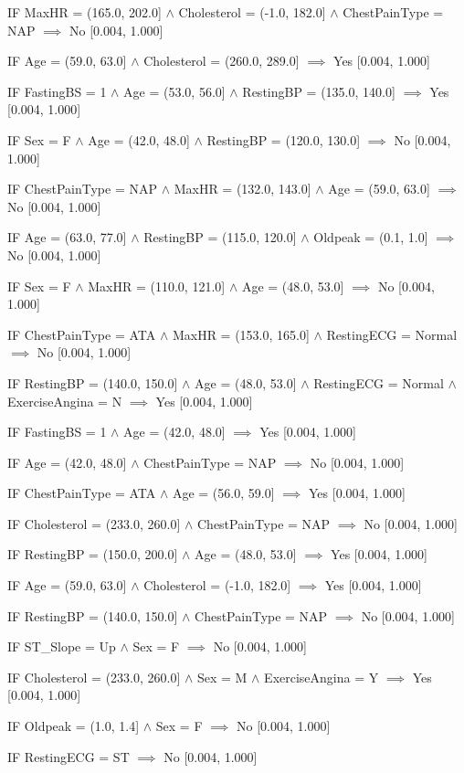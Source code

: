 IF MaxHR = (165.0, 202.0] $\land$ Cholesterol = (-1.0, 182.0] $\land$ ChestPainType = NAP $\implies$ No [0.004, 1.000]

IF Age = (59.0, 63.0] $\land$ Cholesterol = (260.0, 289.0] $\implies$ Yes [0.004, 1.000]

IF FastingBS = 1 $\land$ Age = (53.0, 56.0] $\land$ RestingBP = (135.0, 140.0] $\implies$ Yes [0.004, 1.000]

IF Sex = F $\land$ Age = (42.0, 48.0] $\land$ RestingBP = (120.0, 130.0] $\implies$ No [0.004, 1.000]

IF ChestPainType = NAP $\land$ MaxHR = (132.0, 143.0] $\land$ Age = (59.0, 63.0] $\implies$ No [0.004, 1.000]

IF Age = (63.0, 77.0] $\land$ RestingBP = (115.0, 120.0] $\land$ Oldpeak = (0.1, 1.0] $\implies$ No [0.004, 1.000]

IF Sex = F $\land$ MaxHR = (110.0, 121.0] $\land$ Age = (48.0, 53.0] $\implies$ No [0.004, 1.000]

IF ChestPainType = ATA $\land$ MaxHR = (153.0, 165.0] $\land$ RestingECG = Normal $\implies$ No [0.004, 1.000]

IF RestingBP = (140.0, 150.0] $\land$ Age = (48.0, 53.0] $\land$ RestingECG = Normal $\land$ ExerciseAngina = N $\implies$ Yes [0.004, 1.000]

IF FastingBS = 1 $\land$ Age = (42.0, 48.0] $\implies$ Yes [0.004, 1.000]

IF Age = (42.0, 48.0] $\land$ ChestPainType = NAP $\implies$ No [0.004, 1.000]

IF ChestPainType = ATA $\land$ Age = (56.0, 59.0] $\implies$ Yes [0.004, 1.000]

IF Cholesterol = (233.0, 260.0] $\land$ ChestPainType = NAP $\implies$ No [0.004, 1.000]

IF RestingBP = (150.0, 200.0] $\land$ Age = (48.0, 53.0] $\implies$ Yes [0.004, 1.000]

IF Age = (59.0, 63.0] $\land$ Cholesterol = (-1.0, 182.0] $\implies$ Yes [0.004, 1.000]

IF RestingBP = (140.0, 150.0] $\land$ ChestPainType = NAP $\implies$ No [0.004, 1.000]

IF ST_Slope = Up $\land$ Sex = F $\implies$ No [0.004, 1.000]

IF Cholesterol = (233.0, 260.0] $\land$ Sex = M $\land$ ExerciseAngina = Y $\implies$ Yes [0.004, 1.000]

IF Oldpeak = (1.0, 1.4] $\land$ Sex = F $\implies$ No [0.004, 1.000]

IF RestingECG = ST $\implies$ No [0.004, 1.000]

